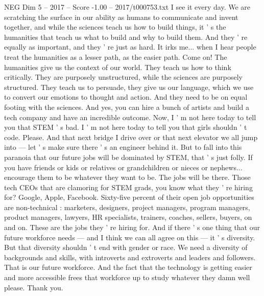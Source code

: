 \begin{textsample}{NEG Dim 5 – 2017 – Score -1.00 – 2017/t000753.txt}
I see it every day.
We are scratching the surface in our ability as humans to communicate and invent together, and while the sciences teach us how to build things, it ' s the humanities that teach us what to build and why to build them.
And they ' re equally as important, and they ' re just as hard.
It irks me... when I hear people treat the humanities as a lesser path, as the easier path.
Come on!
The humanities give us the context of our world.
They teach us how to think critically.
They are purposely unstructured, while the sciences are purposely structured.
They teach us to persuade, they give us our language, which we use to convert our emotions to thought and action.
And they need to be on equal footing with the sciences.
And yes, you can hire a bunch of artists and build a tech company and have an incredible outcome.
Now, I ' m not here today to tell you that STEM ' s bad.
I ' m not here today to tell you that girls shouldn ' t code.
Please.
And that next bridge I drive over or that next elevator we all jump into — let ' s make sure there ' s an engineer behind it.
But to fall into this paranoia that our future jobs will be dominated by STEM, that ' s just folly.
If you have friends or kids or relatives or grandchildren or nieces or nephews... encourage them to be whatever they want to be.
The jobs will be there.
Those tech CEOs that are clamoring for STEM grads, you know what they ' re hiring for?
Google, Apple, Facebook.
Sixty-five percent of their open job opportunities are non-technical : marketers, designers, project managers, program managers, product managers, lawyers, HR specialists, trainers, coaches, sellers, buyers, on and on.
These are the jobs they ' re hiring for.
And if there ' s one thing that our future workforce needs — and I think we can all agree on this — it ' s diversity.
But that diversity shouldn ' t end with gender or race.
We need a diversity of backgrounds and skills, with introverts and extroverts and leaders and followers.
That is our future workforce.
And the fact that the technology is getting easier and more accessible frees that workforce up to study whatever they damn well please.
Thank you.

\end{textsample}
